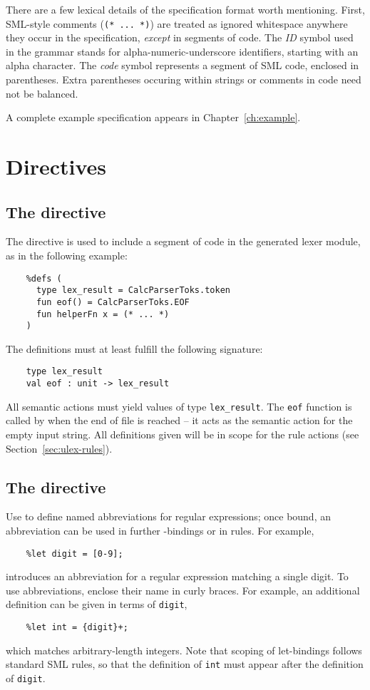There are a few lexical details of the specification format worth mentioning.  First, SML-style comments (\texttt{(* ... *)}) are treated as ignored whitespace anywhere they occur in the specification, \emph{except} in segments of code.  The \textit{ID} symbol used in the grammar stands for alpha-numeric-underscore identifiers, starting with an alpha character.  The \textit{code} symbol represents a segment of SML code, enclosed in parentheses.  Extra parentheses occuring within strings or comments in code need not be balanced.

A complete example specification appears in Chapter~\ref{ch:example}.

\section{Directives}

\subsection{The  directive}

The  directive is used to include a segment of code in the generated lexer module, as in the following example:
\begin{verbatim}
    %defs (
      type lex_result = CalcParserToks.token
      fun eof() = CalcParserToks.EOF
      fun helperFn x = (* ... *)
    )
\end{verbatim}
The definitions must at least fulfill the following signature:
\begin{verbatim}
    type lex_result
    val eof : unit -> lex_result
\end{verbatim}
All semantic actions must yield values of type {\tt lex\_result}.  The {\tt eof} function is called by \ulex{} when the end of file is reached -- it acts as the semantic action for the empty input string.  All definitions given will be in scope for the rule actions (see Section~\ref{sec:ulex-rules}).

\subsection{The  directive}

Use  to define named abbreviations for regular expressions; once bound, an abbreviation can be used in further -bindings or in rules.  For example,
\begin{verbatim}
    %let digit = [0-9];
\end{verbatim}
introduces an abbreviation for a regular expression matching a single digit.  To use abbreviations, enclose their name in curly braces.  For example, an additional  definition can be given in terms of \texttt{digit},
\begin{verbatim}
    %let int = {digit}+;
\end{verbatim}
which matches arbitrary-length integers.  Note that scoping of let-bindings follows standard SML rules, so that the definition of \texttt{int} must appear after the definition of \texttt{digit}.

